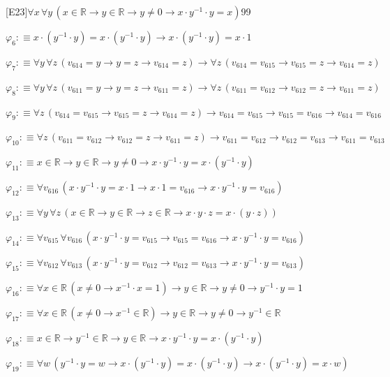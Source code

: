 \begin{fullproof}{[E23]}{$\forall x\,\forall y\,(x \in \mathbb{R} \to y \in \mathbb{R} \to y \neq 0 \to x \cdot y^{-1} \cdot y = x)$}{99}
\begin{abbrevlist}
\item $\varphi_{6} :\equiv x \cdot (y^{-1} \cdot y) = x \cdot (y^{-1} \cdot y) \to x \cdot (y^{-1} \cdot y) = x \cdot 1$
\item $\varphi_{7} :\equiv \forall y\,\forall z\,(v_{614} = y \to y = z \to v_{614} = z) \to \forall z\,(v_{614} = v_{615} \to v_{615} = z \to v_{614} = z)$
\item $\varphi_{8} :\equiv \forall y\,\forall z\,(v_{611} = y \to y = z \to v_{611} = z) \to \forall z\,(v_{611} = v_{612} \to v_{612} = z \to v_{611} = z)$
\item $\varphi_{9} :\equiv \forall z\,(v_{614} = v_{615} \to v_{615} = z \to v_{614} = z) \to v_{614} = v_{615} \to v_{615} = v_{616} \to v_{614} = v_{616}$
\item $\varphi_{10} :\equiv \forall z\,(v_{611} = v_{612} \to v_{612} = z \to v_{611} = z) \to v_{611} = v_{612} \to v_{612} = v_{613} \to v_{611} = v_{613}$
\item $\varphi_{11} :\equiv x \in \mathbb{R} \to y \in \mathbb{R} \to y \neq 0 \to x \cdot y^{-1} \cdot y = x \cdot (y^{-1} \cdot y)$
\item $\varphi_{12} :\equiv \forall v_{616}\,(x \cdot y^{-1} \cdot y = x \cdot 1 \to x \cdot 1 = v_{616} \to x \cdot y^{-1} \cdot y = v_{616})$
\item $\varphi_{13} :\equiv \forall y\,\forall z\,(x \in \mathbb{R} \to y \in \mathbb{R} \to z \in \mathbb{R} \to x \cdot y \cdot z = x \cdot (y \cdot z))$
\item $\varphi_{14} :\equiv \forall v_{615}\,\forall v_{616}\,(x \cdot y^{-1} \cdot y = v_{615} \to v_{615} = v_{616} \to x \cdot y^{-1} \cdot y = v_{616})$
\item $\varphi_{15} :\equiv \forall v_{612}\,\forall v_{613}\,(x \cdot y^{-1} \cdot y = v_{612} \to v_{612} = v_{613} \to x \cdot y^{-1} \cdot y = v_{613})$
\item $\varphi_{16} :\equiv \forall x \in \mathbb{R}\,(x \neq 0 \to x^{-1} \cdot x = 1) \to y \in \mathbb{R} \to y \neq 0 \to y^{-1} \cdot y = 1$
\item $\varphi_{17} :\equiv \forall x \in \mathbb{R}\,(x \neq 0 \to x^{-1} \in \mathbb{R}) \to y \in \mathbb{R} \to y \neq 0 \to y^{-1} \in \mathbb{R}$
\item $\varphi_{18} :\equiv x \in \mathbb{R} \to y^{-1} \in \mathbb{R} \to y \in \mathbb{R} \to x \cdot y^{-1} \cdot y = x \cdot (y^{-1} \cdot y)$
\item $\varphi_{19} :\equiv \forall w\,(y^{-1} \cdot y = w \to x \cdot (y^{-1} \cdot y) = x \cdot (y^{-1} \cdot y) \to x \cdot (y^{-1} \cdot y) = x \cdot w)$

\end{abbrevlist}
\end{fullproof}
